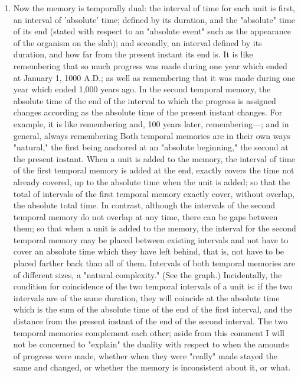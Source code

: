 \documentclass[10pt,twoside]{memoir}
\begin{document}
\begin{enumerate}
{\begin{enumerate}
\begin{sysrules}
\begin{sysrules}
\begin{sysrules}
\begin{sysrules}
{\begin{enumerate}
\begin{enumerate}
\item Now the memory is temporally dual: the interval of time for each 
unit is first, an interval of 'absolute' time; defined by its duration, and the 
"absolute" time of its end (stated with respect to an "absolute event" such 
as the appearance of the organism on the slab); and secondly, an interval 
defined by its duration, and how far from the present instant its end is. It is 
like remembering that so much progress was made during one year which 
ended at January 1, 1000 A.D.; as well as remembering that it was made 
during one year which ended 1,000 years ago. In the second temporal 
memory, the absolute time of the end of the interval to which the progress is 
assigned changes according as the absolute time of the present instant 
changes. For example, it is like remembering  and, 100 years later, 
remembering---; and in general, always remembering  Both temporal 
memories are in their own ways "natural," the first being anchored at an 
"absolute beginning," the second at the present instant. When a unit is added 
to the memory, the interval of time of the first temporal memory is added at 
the end, exactly covers the time not already covered, up to the absolute time 
when the unit is added; so that the total of intervals of the first temporal 
memory exactly cover, without overlap, the absolute total time. In contrast, 
although the intervals of the second temporal memory do not overlap at any 
time, there can be gaps between them; so that when a unit is added to the 
memory, the interval for the second temporal memory may be placed 
between existing intervals and not have to cover an absolute time which they 
have left behind, that is, not have to be placed farther back than all of them. 
Intervals of both temporal memories are of different sizes, a "natural 
complexity." (See the graph.) Incidentally, the condition for coincidence of 
the two temporal intervals of a unit is: if the two intervals are of the same 
duration, they will coincide at the absolute time which is the sum of the 
absolute time of the end of the first interval, and the distance from the 
present instant of the end of the second interval. The two temporal 
memories complement each other; aside from this comment I will not be 
concerned to "explain" the duality with respect to when the amounts of 
progress were made, whether when they were "really" made stayed the same 
and changed, or whether the memory is inconsistent about it, or what. 


\end{enumerate}
\end{enumerate}}
\end{sysrules}
\end{sysrules}
\end{sysrules}
\end{sysrules}
\end{enumerate}}
\end{enumerate}
\end{document}
